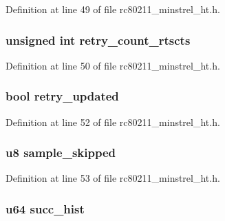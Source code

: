 Definition at line 49 of file rc80211\-\_\-minstrel\-\_\-ht.\-h.

\hypertarget{structminstrel__rate__stats_ade58922c4f5867f4871e88d7d53c92fe}{
\subsubsection[{retry\-\_\-count\-\_\-rtscts}]{\setlength{\rightskip}{0pt plus 5cm}unsigned int retry\-\_\-count\-\_\-rtscts}}\label{structminstrel__rate__stats_ade58922c4f5867f4871e88d7d53c92fe}


Definition at line 50 of file rc80211\-\_\-minstrel\-\_\-ht.\-h.

\hypertarget{structminstrel__rate__stats_afe4f0bbc7c9792a73c06d4cd49a7eda1}{
\subsubsection[{retry\-\_\-updated}]{\setlength{\rightskip}{0pt plus 5cm}bool retry\-\_\-updated}}\label{structminstrel__rate__stats_afe4f0bbc7c9792a73c06d4cd49a7eda1}


Definition at line 52 of file rc80211\-\_\-minstrel\-\_\-ht.\-h.

\hypertarget{structminstrel__rate__stats_a3ef5f3da43bcca6331c539dc59d39b72}{
\subsubsection[{sample\-\_\-skipped}]{\setlength{\rightskip}{0pt plus 5cm}u8 sample\-\_\-skipped}}\label{structminstrel__rate__stats_a3ef5f3da43bcca6331c539dc59d39b72}


Definition at line 53 of file rc80211\-\_\-minstrel\-\_\-ht.\-h.

\hypertarget{structminstrel__rate__stats_af2ad78ee531872588a173945378c1b51}{
\subsubsection[{succ\-\_\-hist}]{\setlength{\rightskip}{0pt plus 5cm}u64 succ\-\_\-hist}}\label{structminstrel__rate__stats_af2ad78ee531872588a173945378c1b51}


